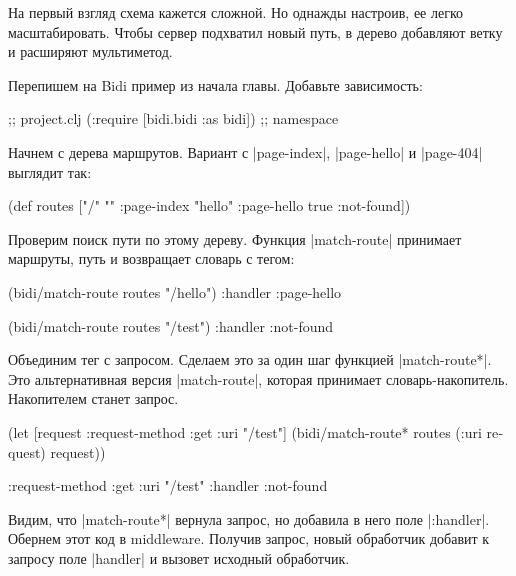 На первый взгляд схема кажется сложной. Но однажды настроив, ее легко
масштабировать. Чтобы сервер подхватил новый путь, в дерево добавляют ветку и
расширяют мультиметод.

Перепишем на Bidi пример из начала главы. Добавьте зависимость:

\begin{english}
  \begin{clojure}
[bidi "2.1.5"]                  ;; project.clj
(:require [bidi.bidi :as bidi]) ;; namespace
  \end{clojure}
\end{english}

Начнем с дерева маршрутов. Вариант с \spverb|page-index|, \spverb|page-hello| и
\spverb|page-404| выглядит так:

\begin{english}
  \begin{clojure}
(def routes
  ["/" {""      :page-index
        "hello" :page-hello
        true    :not-found}])
  \end{clojure}
\end{english}

Проверим поиск пути по этому дереву. Функция \spverb|match-route| принимает
маршруты, путь и возвращает словарь с тегом:

\begin{english}
  \begin{clojure}
(bidi/match-route routes "/hello")
{:handler :page-hello}

(bidi/match-route routes "/test")
{:handler :not-found}
  \end{clojure}
\end{english}

Объединим тег с запросом. Сделаем это за один шаг функцией
\spverb|match-route*|. Это альтернативная версия \spverb|match-route|, которая
принимает словарь-накопитель. Накопителем станет запрос.

\begin{english}
  \begin{clojure}
(let [request {:request-method :get
               :uri "/test"}]
  (bidi/match-route* routes (:uri request) request))

{:request-method :get
 :uri "/test"
 :handler :not-found}
  \end{clojure}
\end{english}

Видим, что \spverb|match-route*| вернула запрос, но добавила в него поле
\spverb|:handler|. Обернем этот код в middleware. Получив запрос, новый
обработчик добавит к запросу поле \spverb|handler| и вызовет исходный
обработчик.

